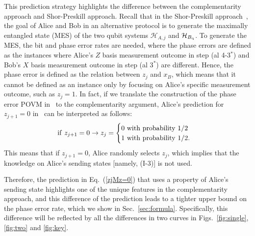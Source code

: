 \documentclass[prl,twocolumn,superscriptaddress,nofootinbib]{revtex4}
\def\U#1{{\rm #1}}
\begin{document}
This prediction strategy highlights the difference between the complementarity approach and Shor-Preskill approach. 
Recall that in the Shor-Preskill approach~\cite{Kiyoshi2012dps}, the goal of Alice and Bob in an alternative protocol
is to generate the maximally entangled state (MES) of the two qubit systems $\mathcal{H}_{A,j}$ and $\mathcal{H}_{B_{\U{q}}}$. 
To generate the MES, the bit and phase error rates are needed, where the phase errors are defined as the instances where 
Alice's $Z$ basis measurement outcome in step (al 4-3$^*$) and Bob's $X$ basis measurement outcome in step (al 3$^*$)
are different.
Hence, the phase error is defined as the relation between $z_j$ and $x_B$, 
which means that it cannot be defined as an instance only by focusing on Alice's specific measurement outcome,
such as $z_j=1$. 
In fact, if we translate the construction of the phase error POVM in~\cite{Kiyoshi2012dps} 
to the complementarity argument, Alice's prediction for $z_{j+1}=0$ in~\cite{Kiyoshi2012dps} can be interpreted as follows: 
\begin{align}
  \U{if}~z_{j+1}=0
\rightarrow z_j=
\begin{cases}
  0~\U{with~probability~1/2}\\
  1~\U{with~probability~1/2}.
  \label{zj+10SP}
\end{cases}
\end{align}
This means that if $z_{j+1}=0$, Alice randomly selects $z_j$, 
which implies that the knowledge on Alice's sending states [namely, (I-3)] is not used. 

Therefore, the prediction in Eq.~(\ref{zjMz=0}) that uses a property of Alice's sending state highlights 
one of the unique features in the complementarity approach, and
this difference of the prediction
leads to a tighter upper bound on the phase error rate, which we show in Sec.~\ref{sec:formula}. 
Specifically, this difference will be reflected by all the differences in two curves 
in Figs.~\ref{fig:single}, \ref{fig:two} and \ref{fig:key}.
\end{document}
